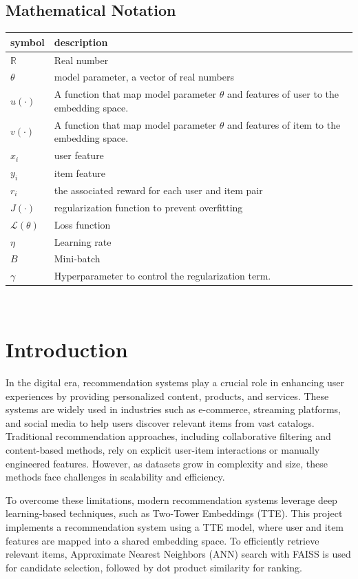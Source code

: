 \documentclass[12pt]{article}
\begin{document}
\subsection{Mathematical Notation}

\renewcommand{\arraystretch}{1.2}
\begin{tabular}{l l} 
  \toprule		
  \textbf{symbol} & \textbf{description}\\
  \midrule 
  $\mathbb{R}$ & Real number\\
  $\theta$ & model parameter, a vector of real numbers\\
  $u(\cdot)$ & A function that map model parameter $\theta$ and features of user to the embedding space.\\
  $v(\cdot)$ & A function that map model parameter $\theta $ and features of item to the embedding space.\\
  $x_i$ & user feature\\
  $y_i$ & item feature\\
  $r_i$ & the associated reward for each user and item pair\\ 
  $J(\cdot)$ & regularization function to prevent overfitting\\
  $\mathcal{L}(\theta)$ & Loss function\\
  $\eta $ & Learning rate\\
  $B $ & Mini-batch\\
  $\gamma$ & Hyperparameter to control the regularization term. \\
    \bottomrule
\end{tabular}\\

\section{Introduction}
In the digital era, recommendation systems play a crucial role in enhancing user experiences by providing personalized content, products, and services. These systems are widely used in industries such as e-commerce, streaming platforms, and social media to help users discover relevant items from vast catalogs. Traditional recommendation approaches, including collaborative filtering and content-based methods, rely on explicit user-item interactions or manually engineered features. However, as datasets grow in complexity and size, these methods face challenges in scalability and efficiency.

To overcome these limitations, modern recommendation systems leverage deep learning-based techniques, such as Two-Tower Embeddings (TTE). This project implements a recommendation system using a TTE model, where user and item features are mapped into a shared embedding space. To efficiently retrieve relevant items, Approximate Nearest Neighbors (ANN) search with FAISS is used for candidate selection, followed by dot product similarity for ranking.
\end{document}
